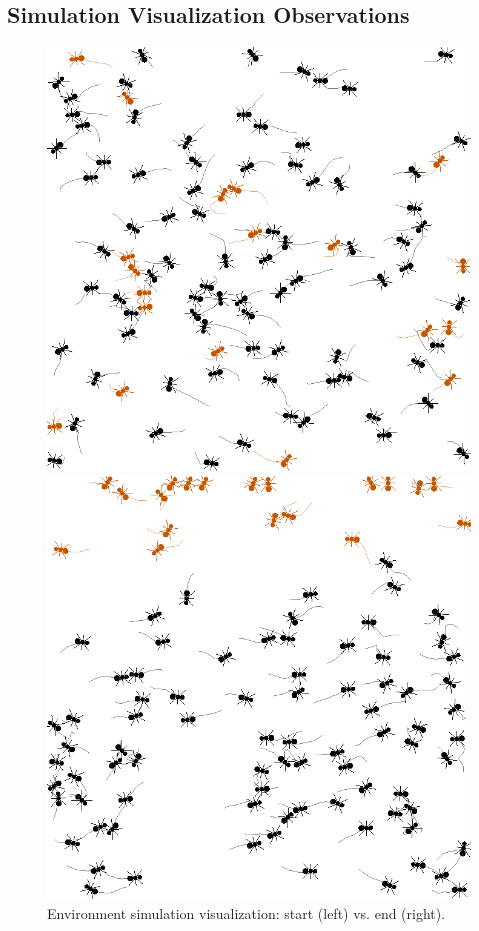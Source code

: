 \documentclass[9pt]{IEEEtran}
\begin{document}
\subsection{Simulation Visualization Observations}

\begin{figure}[hbt]
    \centering
    \begin{minipage}{0.2\textwidth}
        \centering
        \includegraphics[width=.9\linewidth]{frame_25.png}
    \end{minipage}
    \hspace{0.2cm}
    \begin{minipage}{0.2\textwidth}
        \centering
        \includegraphics[width=.9\linewidth]{frame_1300.png}
    \end{minipage}
    \caption{Environment simulation visualization: start (left) vs. end (right).}
    \label{fig:trained_viz}
\end{figure}
\end{document}
